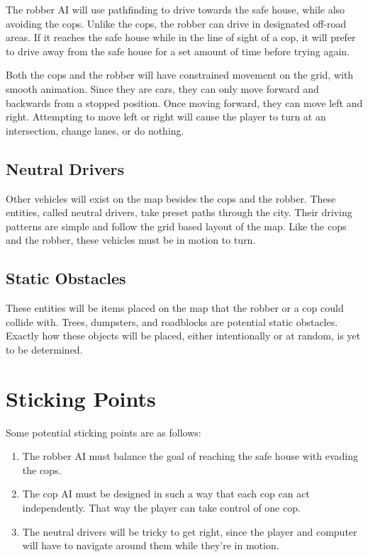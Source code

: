 \documentclass[12pt]{article}
\begin{document}
\par The robber AI will use pathfinding to drive towards the safe house, while also avoiding the cops. Unlike the cops, the robber can drive in designated off-road areas. If it reaches the safe house while in the line of sight of a cop, it will prefer to drive away from the safe house for a set amount of time before trying again.

\par Both the cops and the robber will have constrained movement on the grid, with smooth animation. Since they are cars, they can only move forward and backwards from a stopped position. Once moving forward, they can move left and right. Attempting to move left or right will cause the player to turn at an intersection, change lanes, or do nothing.

\subsection{Neutral Drivers} \label{neutraldrivers}
Other vehicles will exist on the map besides the cops and the robber. These entities, called neutral drivers, take preset paths through the city. Their driving patterns are simple and follow the grid based layout of the map. Like the cops and the robber, these vehicles must be in motion to turn.

\subsection{Static Obstacles}
These entities will be items placed on the map that the robber or a cop could collide with. Trees, dumpsters, and roadblocks are potential static obstacles. Exactly how these objects will be placed, either intentionally or at random, is yet to be determined.

\section{Sticking Points}
Some potential sticking points are as follows:
\begin{enumerate}
    \item The robber AI must balance the goal of reaching the safe house with evading the cops.
    \item The cop AI must be designed in such a way that each cop can act independently. That way the player can take control of one cop.
    \item The neutral drivers will be tricky to get right, since the player and computer will have to navigate around them while they're in motion.
\end{enumerate}
\end{document}
